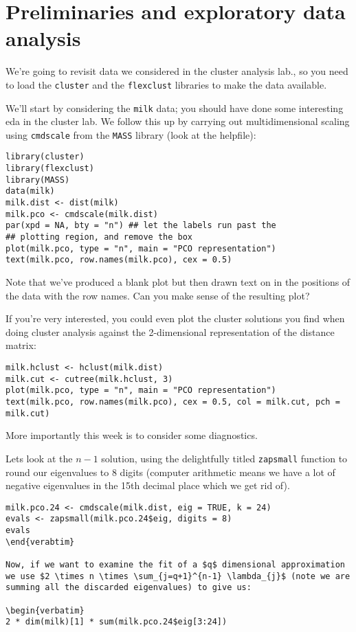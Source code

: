 

\section{Preliminaries and exploratory data analysis}

We're going to revisit data we considered in the cluster analysis lab., so you need to load the \texttt{cluster} and the \texttt{flexclust} libraries to make the data available.

We'll start by considering the \texttt{milk} data; you should have done some interesting eda in the cluster lab.   We follow this up by carrying out multidimensional scaling using \texttt{cmdscale} from the \texttt{MASS} library (look at the helpfile):

\begin{verbatim}
library(cluster)
library(flexclust)
library(MASS)
data(milk)
milk.dist <- dist(milk)
milk.pco <- cmdscale(milk.dist)
par(xpd = NA, bty = "n") ## let the labels run past the 
## plotting region, and remove the box
plot(milk.pco, type = "n", main = "PCO representation")
text(milk.pco, row.names(milk.pco), cex = 0.5)
\end{verbatim}

Note that we've produced a blank plot but then drawn text on in the positions of the data with the row names.   Can you make sense of the resulting plot?

If you're very interested, you could even plot the cluster solutions you find when doing cluster analysis against the 2-dimensional representation of the distance matrix:

\begin{verbatim}
milk.hclust <- hclust(milk.dist)
milk.cut <- cutree(milk.hclust, 3)
plot(milk.pco, type = "n", main = "PCO representation")
text(milk.pco, row.names(milk.pco), cex = 0.5, col = milk.cut, pch = milk.cut)
\end{verbatim}


More importantly this week is to consider some diagnostics.


Lets look at the $n-1$ solution, using the delightfully titled \texttt{zapsmall} function to round our eigenvalues to 8 digits (computer arithmetic means we have a lot of negative eigenvalues in the 15th decimal place which we get rid of).   

\begin{verbatim}
milk.pco.24 <- cmdscale(milk.dist, eig = TRUE, k = 24)
evals <- zapsmall(milk.pco.24$eig, digits = 8)
evals
\end{verabtim}

Now, if we want to examine the fit of a $q$ dimensional approximation we use $2 \times n \times \sum_{j=q+1}^{n-1} \lambda_{j}$ (note we are summing all the discarded eigenvalues) to give us: 

\begin{verbatim}
2 * dim(milk)[1] * sum(milk.pco.24$eig[3:24])
\end{verbatim}

